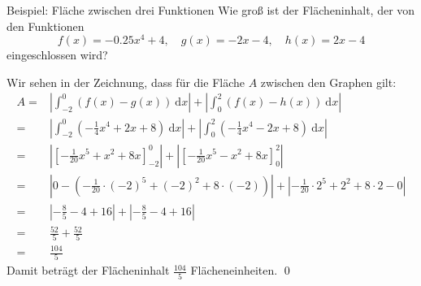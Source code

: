 \documentclass[german]{../spicker}
\renewcommand{\abs}[1]{\left| #1 \right|}
\newcommand{\dx}{~\mathrm{d}x}
\begin{document}
\begin{bonus}{Beispiel: Fläche zwischen drei Funktionen}
    Wie groß ist der Flächeninhalt, der von den Funktionen
    $$
        f(x) = -0.25x^4 + 4, \quad g(x) = -2x-4, \quad h(x) = 2x-4
    $$
    eingeschlossen wird?
    \begin{center}
    \end{center}

    Wir sehen in der Zeichnung, dass für die Fläche $A$ zwischen den Graphen gilt:
    $$
        \begin{aligned}
            A ={} & \abs{  \int_{-2}^{0} \left(f(x) - g(x)\right) \dx} + \abs{ \int_{0}^{2} \left(f(x) - h(x)\right) \dx}                           \\
            ={}   & \abs{ \int_{-2}^{0} \left(-\frac{1}{4}x^4 + 2x + 8\right) \dx} + \abs{ \int_{0}^{2} \left(-\frac{1}{4}x^4 - 2x + 8\right) \dx}  \\
            ={}   & \abs{ \left[ -\frac{1}{20}x^5 + x^2 + 8x \right]_{-2}^{0} } + \abs{ \left[ -\frac{1}{20}x^5 - x^2 + 8x \right]_0^2 }            \\
            ={}   & \abs{ 0 - \left( -\frac{1}{20}\cdot(-2)^5 + (-2)^2 + 8\cdot(-2) \right) } + \abs{ -\frac{1}{20}\cdot 2^5 + 2^2 + 8\cdot 2 - 0 } \\
            ={}   & \abs{-\frac{8}{5} - 4 + 16 } + \abs{-\frac{8}{5} - 4 + 16}                                                                      \\
            ={}   & \frac{52}{5} + \frac{52}{5}                                                                                                     \\
            ={}   & \frac{104}{5}
        \end{aligned}
    $$
    Damit beträgt der Flächeninhalt $\frac{104}{5}$ Flächeneinheiten. \qed
\end{bonus}
\end{document}
